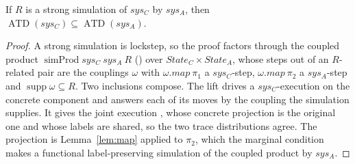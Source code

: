 \begin{theorem}
  \label{thm:strongsound}
  \leanok
  If $R$ is a strong simulation of $sys_C$ by $sys_A$, then $\operatorname{ATD}(sys_C) \subseteq \operatorname{ATD}(sys_A)$.
\end{theorem}

\begin{proof}\leanok
  A strong simulation is lockstep, so the proof factors through the coupled product $\operatorname{simProd} sys_C\ sys_A\ R$ () over $State_C \times State_A$, whose steps out of an $R$-related pair are the couplings $\omega$ with $\omega.map\ \pi_1$ a $sys_C$-step, $\omega.map\ \pi_2$ a $sys_A$-step and $\operatorname{supp}\omega \subseteq R$.
  Two inclusions compose.
  The lift  drives a $sys_C$-execution on the concrete component and answers each of its moves by the coupling the simulation supplies.
  It gives the joint execution , whose concrete projection is the original one and whose labels are shared, so the two trace distributions agree.
  The projection is Lemma~\ref{lem:map} applied to $\pi_2$, which the marginal condition makes a functional label-preserving simulation of the coupled product by $sys_A$.
\end{proof}
